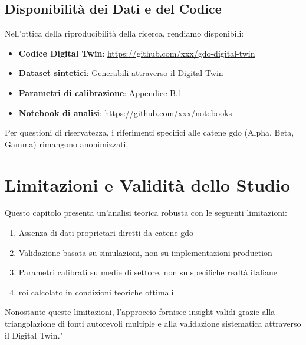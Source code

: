 \subsection*{Disponibilità dei Dati e del Codice}

Nell'ottica della riproducibilità della ricerca, rendiamo disponibili:
\begin{itemize}
    \item \textbf{Codice Digital Twin}: \url{https://github.com/xxx/gdo-digital-twin}
    \item \textbf{Dataset sintetici}: Generabili attraverso il Digital Twin
    \item \textbf{Parametri di calibrazione}: Appendice B.1
    \item \textbf{Notebook di analisi}: \url{https://github.com/xxx/notebooks}
\end{itemize}

Per questioni di riservatezza, i riferimenti specifici alle catene 
\gls{gdo} (Alpha, Beta, Gamma) rimangono anonimizzati.

\section{\texorpdfstring{Limitazioni e Validità dello Studio}{2.8 - Limitazioni e Validità dello Studio}}

Questo capitolo presenta un'analisi teorica robusta con le seguenti limitazioni:
\begin{enumerate}
    \item Assenza di dati proprietari diretti da catene \gls{gdo}
    \item Validazione basata su simulazioni, non su implementazioni production
    \item Parametri calibrati su medie di settore, non su specifiche realtà italiane
    \item \gls{roi} calcolato in condizioni teoriche ottimali
\end{enumerate}

Nonostante queste limitazioni, l'approccio fornisce insight validi 
grazie alla triangolazione di fonti autorevoli multiple e alla 
validazione sistematica attraverso il Digital Twin."

\clearpage
\printbibliography[
    heading=subbibliography,
    title={Riferimenti Bibliografici del Capitolo 2},
]

